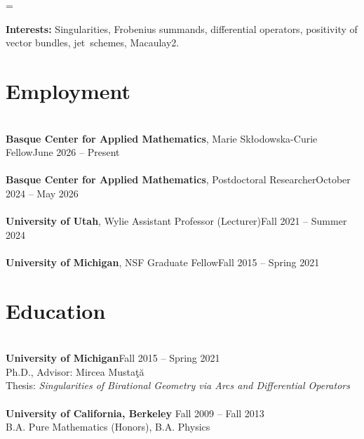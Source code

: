 \documentclass{res}
\begin{document}
\newdimen\linew
\linew=\textwidth
\advance\linew\hoffset 

\address{dmallory@bcamath.org\qquad \url{https://devlin-mallory.github.io/} 
\\\vspace{-2pt} }
\setlength{\leftmargini}{-10pt}

\renewcommand\sectionfont{\large \sc}
\begin{resume}
{\bf Interests:} Singularities, Frobenius summands, differential operators, positivity of vector bundles, jet~schemes, Macaulay2.

\section{Employment} 
\ \\
{\bf Basque Center for Applied Mathematics}, Marie Sk\l odowska-Curie Fellow\hfill June 2026 -- Present
\\\\
{\bf Basque Center for Applied Mathematics}, Postdoctoral Researcher\hfill October 2024 -- May 2026
\\\\
{\bf University of Utah}, Wylie Assistant Professor (Lecturer)\hfill Fall 2021 -- Summer 2024
\\\\
{\bf University of Michigan}, NSF Graduate Fellow\hfill Fall 2015 -- Spring 2021
\section{Education} 
\ \\
{\bf University of Michigan}\hfill Fall 2015 -- Spring 2021
\\ Ph.D., Advisor: Mircea Musta\c{t}\u{a}
\\ Thesis: \emph{Singularities of Birational Geometry via Arcs and Differential Operators}
\\
\\
{\bf University of California, Berkeley} \hfill Fall 2009 -- Fall 2013\\B.A. Pure Mathematics (Honors),  B.A. Physics 




\end{resume}
\end{document}
